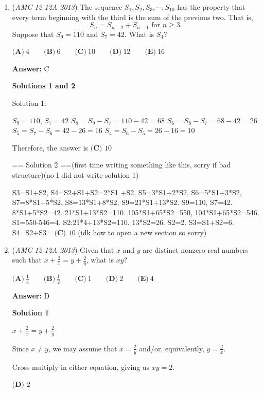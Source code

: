 \begin{enumerate}
 


	\item (\textit{AMC 12 12A 2013}) The sequence $S_1, S_2, S_3, \cdots, S_{10}$ has the property that every term beginning with the third is the sum of the previous two.  That is, 
 \[S_n = S_{n-2} + S_{n-1} \text{ for } n \ge 3.\] Suppose that $S_9 = 110$ and $S_7 = 42$.  What is $S_4$?


 $\textbf{(A)}\ 4\qquad\textbf{(B)}\ 6\qquad\textbf{(C)}\ 10\qquad\textbf{(D)}\ 12\qquad\textbf{(E)}\ 16\qquad$

 \textbf{Answer: }C



\textbf{Solutions 1 and 2}

Solution 1:

 $S_9 = 110$, $S_7 = 42$
$S_8 = S_9 - S_ 7 = 110 - 42 = 68$
$S_6 = S_8 - S_7 = 68 - 42 = 26$
$S_5 = S_7 - S_6 = 42 - 26 = 16$
$S_4 = S_6 - S_5 = 26 - 16 = 10$

 Therefore, the answer is $\boxed{\textbf{(C) }{10}}$

 
== Solution 2 ==(first time writing something like this, sorry if bad structure)(no I did not write solution 1)

 S3=S1+S2, S4=S2+S1+S2=2*S1 +S2, S5=3*S1+2*S2, S6=5*S1+3*S2, S7=8*S1+5*S2, S8=13*S1+8*S2, S9=21*S1+13*S2. S9=110, S7=42. 8*S1+5*S2=42. 21*S1+13*S2=110. 105*S1+65*S2=550, 104*S1+65*S2=546. S1=550-546=4. S2:21*4+13*S2=110. 13*S2=26. S2=2. S3=S1+S2=6. S4=S2+S3= $\boxed{\textbf{(C) }{10}}$ (idk how to open a new section so sorry) 

 


	\item (\textit{AMC 12 12A 2013}) Given that $x$ and $y$ are distinct nonzero real numbers such that $x+\frac{2}{x} = y + \frac{2}{y}$, what is $xy$?


 $\textbf{(A)}\ \frac{1}{4}\qquad\textbf{(B)}\ \frac{1}{2}\qquad\textbf{(C)}\ 1\qquad\textbf{(D)}\ 2\qquad\textbf{(E)}\ 4\qquad$

 \textbf{Answer: }D



\textbf{Solution 1}

$x+\frac{2}{x}= y+\frac{2}{y}$

 Since $x\not=y$, we may assume that $x=\frac{2}{y}$ and/or, equivalently, $y=\frac{2}{x}$.

 Cross multiply in either equation, giving us $xy=2$.

 $\boxed{\textbf{(D) }{2}}$





\end{enumerate}
